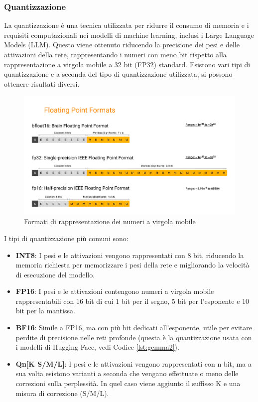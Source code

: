 \subsubsection{Quantizzazione}
La quantizzazione è una tecnica utilizzata per ridurre il consumo di memoria e i requisiti computazionali nei modelli di machine learning, inclusi i Large Language Models (LLM). Questo viene ottenuto riducendo la precisione dei pesi e delle attivazioni della rete, rappresentando i numeri con meno bit rispetto alla rappresentazione a virgola mobile a 32 bit (FP32) standard.
Esistono vari tipi di quantizzazione e a seconda del tipo di quantizzazione utilizzata, si possono ottenere risultati diversi.
\begin{figure}[!t]
    \centering
    \includegraphics[width=\textwidth]{Images/cap3/quant.png}
    \caption{Formati di rappresentazione dei numeri a virgola mobile \cite{quanttensorops}}
    \label{fig:floatingpoint}
\end{figure}
I tipi di quantizzazione più comuni sono:
\begin{itemize}
    \item \textbf{INT8}: I pesi e le attivazioni vengono rappresentati con 8 bit, riducendo la memoria richiesta per memorizzare i pesi della rete e migliorando la velocità di esecuzione del modello.
    \item \textbf{FP16}: I pesi e le attivazioni contengono numeri a virgola mobile rappresentabili con 16 bit di cui 1 bit per il segno, 5 bit per l'esponente e 10 bit per la mantissa.
    \item \textbf{BF16}: Simile a FP16, ma con più bit dedicati all'esponente, utile per evitare perdite di precisione nelle reti profonde (questa è la quantizzazione usata con i modelli di Hugging Face, vedi Codice \ref{lst:gemma2}).
    \item \textbf{Qn[K S/M/L]}: I pesi e le attivazioni vengono rappresentati con n bit, ma a sua volta esistono varianti a seconda che vengano effettuate o meno delle correzioni sulla perplessità. In quel caso viene aggiunto il suffisso K e una misura di correzione (S/M/L).
\end{itemize}

